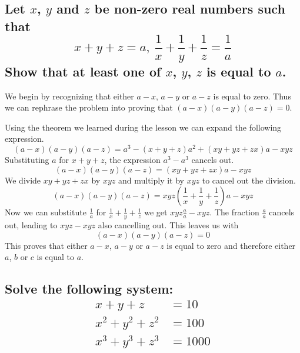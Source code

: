 \documentclass{article}
\begin{document}
\subsection{
	\normalfont
	Let $x$, $y$ and $z$ be non-zero real numbers such that
	\[x + y + z = a,\ \frac{1}{x} + \frac{1}{y} + \frac{1}{z} = \frac{1}{a}\]
	Show that at least one of $x$, $y$, $z$ is equal to $a$.
}

We begin by recognizing that either $a - x$, $a - y$ or $a - z$ is equal to zero. Thus we can rephrase the problem into proving that $ (a - x)(a - y)(a - z) = 0 $.

Using the theorem we learned during the lesson we can expand the following expression.
\[(a-x)(a-y)(a-z) = a^3 - (x + y + z)a^2 + (xy + yz + zx)a - xyz\]
Substituting $a$ for $ x + y + z $, the expression $a^3 - a^3$ cancels out.
\[(a-x)(a-y)(a-z) = (xy + yz + zx)a - xyz\]
We divide $xy + yz + zx$ by $xyz$ and multiply it by $xyz$ to cancel out the division.
\[(a-x)(a-y)(a-z) = xyz\left(\frac{1}{x} + \frac{1}{y} + \frac{1}{z}\right)a - xyz\]
Now we can substitute $ \frac{1}{a} $ for $ \frac{1}{x} + \frac{1}{y} + \frac{1}{z} $ we get $ xyz\frac{a}{a} - xyz $. The fraction $ \frac{a}{a} $ cancels out, leading to $xyz - xyz$ also cancelling out.
This leaves us with
\[(a-x)(a-y)(a-z) = 0\]
This proves that either $a - x$, $a - y$ or $a - z$ is equal to zero and therefore either $a$, $b$ or $c$ is equal to $a$.

\subsection{
	\normalfont
	Solve the following system:
	\begin{align*}
		x + y + z       & = 10   \\
		x^2 + y^2 + z^2 & = 100  \\
		x^3 + y^3 + z^3 & = 1000
	\end{align*}
}
\end{document}
